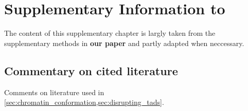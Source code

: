 \chapter{Supplementary Information to \texorpdfstring{}{the Balancer Project}}
\label{sec:suppl_balancer}


The content of this supplementary chapter is largly taken from the supplementary
methods in \textbf{our paper} and partly adapted when
neccessary.


\section{Commentary on cited literature}
\label{sec:suppl_balancer_literature}

Comments on literature used in \cref{sec:chromatin_conformation,sec:disrupting_tads}.
